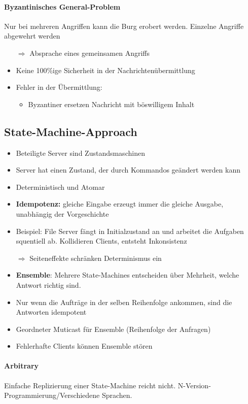 \documentclass{scrartcl}
\begin{document}
\paragraph{Byzantinisches General-Problem}
Nur bei mehreren Angriffen kann die Burg erobert werden. Einzelne Angriffe abgewehrt werden
\begin{itemize}
\item[$\Rightarrow$] Absprache eines gemeinsamen Angriffs
\item Keine 100\%ige Sicherheit in der Nachrichtenübermittlung
\item Fehler in der Übermittlung:
\begin{itemize}
\item Byzantiner ersetzen Nachricht mit böswilligem Inhalt
\end{itemize}
\end{itemize}



\subsection{State-Machine-Approach} \label{sma}
\begin{itemize}
\item Beteiligte Server sind Zustandsmaschinen
\item Server hat einen Zustand, der durch Kommandos geändert werden kann
\item Deterministisch und Atomar 
\item \textbf{Idempotenz:} gleiche Eingabe erzeugt immer die gleiche Ausgabe, unabhängig der Vorgeschichte
\item Beispiel: File Server fängt in Initialzustand an und arbeitet die Aufgaben squentiell ab. Kollidieren Clients, entsteht Inkonsistenz
\item[$\Rightarrow$] Seiteneffekte schränken Determinismus ein
\item \textbf{Ensemble}: Mehrere State-Machines entscheiden über Mehrheit, welche Antwort richtig sind.
\item Nur wenn die Aufträge in der selben Reihenfolge ankommen, sind die Antworten idempotent
\item Geordneter Muticast für Ensemble (Reihenfolge der Anfragen)
\item Fehlerhafte Clients können Ensemble stören
\end{itemize}

\paragraph{Arbitrary} Einfache Replizierung einer State-Machine reicht nicht. N-Version-Programmierung/Verschiedene Sprachen. 
\end{document}

